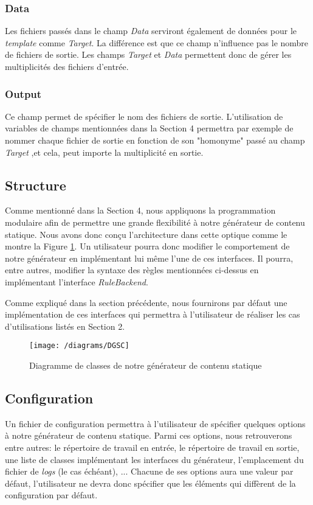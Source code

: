		\subsubsection*{Data}
			Les fichiers passés dans le champ \textit{Data} serviront également de données pour le \textit{template} comme \textit{Target}. La différence est que ce champ n'influence pas le nombre de fichiers de sortie. Les champs \textit{Target} et \textit{Data} permettent donc de gérer les multiplicités des fichiers d'entrée.
		
		\subsubsection*{Output}
			Ce champ permet de spécifier le nom des fichiers de sortie. L'utilisation de variables de champs mentionnées dans la Section 4 permettra par exemple de nommer chaque fichier de sortie en fonction de son "homonyme" passé au champ \textit{Target} ,et cela, peut importe la multiplicité en sortie.
	
	
	\subsection{Structure}
		Comme mentionné dans la Section 4, nous appliquons la programmation modulaire afin de permettre une grande flexibilité à notre générateur de contenu statique. Nous avons donc conçu l'architecture dans cette optique comme le montre la Figure \ref{fig:class_diagram}. Un utilisateur pourra donc modifier le comportement de notre générateur en implémentant lui même l'une de ces interfaces. Il pourra, entre autres, modifier la syntaxe des règles mentionnées ci-dessus en implémentant l'interface \textit{RuleBackend}.
		
		Comme expliqué dans la section précédente, nous fournirons par défaut une implémentation de ces interfaces qui permettra à l'utilisateur de réaliser les cas d'utilisations listés en Section 2.
		
		\begin{figure}
			\texttt{[image: /diagrams/DGSC]}
			\caption{Diagramme de classes de notre générateur de contenu statique}
			\label{fig:class_diagram}
		\end{figure} 
	
	
	\subsection{Configuration}
		Un fichier de configuration permettra à l'utilisateur de spécifier quelques options à notre générateur de contenu statique. Parmi ces options, nous retrouverons entre autres: le répertoire de travail en entrée, le répertoire de travail en sortie, une liste de classes implémentant les interfaces du générateur, l'emplacement du fichier de \textit{logs} (le cas échéant), ... Chacune de ses options aura une valeur par défaut, l'utilisateur ne devra donc spécifier que les éléments qui diffèrent de la configuration par défaut. 